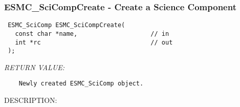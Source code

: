  
\setlength{\oldparskip}{\parskip}
\setlength{\parskip}{1.5ex}
\setlength{\oldparindent}{\parindent}
\setlength{\parindent}{0pt}
\setlength{\oldbaselineskip}{\baselineskip}
\setlength{\baselineskip}{11pt}
 
\def\bv{\begin{verbatim}}
\def\ev{\end{verbatim}}
\def\be{\begin{equation}}
\def\ee{\end{equation}}
\def\bea{\begin{eqnarray}}
\def\eea{\end{eqnarray}}
\def\bi{\begin{itemize}}
\def\ei{\end{itemize}}
\def\bn{\begin{enumerate}}
\def\en{\end{enumerate}}
\def\bd{\begin{description}}
\def\ed{\end{description}}
\def\({\left (}
\def\){\right )}
\def\[{\left [}
\def\]{\right ]}
\def\<{\left  \langle}
\def\>{\right \rangle}
\def\cI{{\cal I}}
\def\diag{\mathop{\rm diag}}
\def\tr{\mathop{\rm tr}}


 
\subsubsection [ESMC\_SciCompCreate] {ESMC\_SciCompCreate - Create a Science Component}


  
\begin{verbatim} ESMC_SciComp ESMC_SciCompCreate(
   const char *name,                    // in 
   int *rc                              // out
 );\end{verbatim}{\em RETURN VALUE:}
\begin{verbatim}    Newly created ESMC_SciComp object.\end{verbatim}
{\sf DESCRIPTION:\\ }


